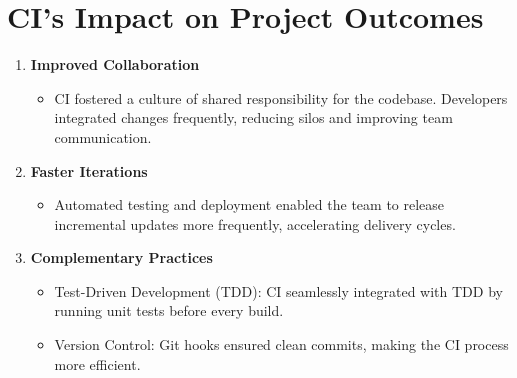 \documentclass[a4paper,12pt]{article}
\begin{document}
\section{CI’s Impact on Project Outcomes}
\begin{enumerate}
    \item \textbf{Improved Collaboration}
        \begin{itemize}
            \item CI fostered a culture of shared responsibility for the codebase. Developers integrated changes
                frequently, reducing silos and improving team communication.
        \end{itemize}
    \item \textbf{Faster Iterations}
        \begin{itemize}
            \item Automated testing and deployment enabled the team to release incremental updates more
                frequently, accelerating delivery cycles.
    \end{itemize}
\item \textbf{Complementary Practices}
    \begin{itemize}
        \item Test-Driven Development (TDD): CI seamlessly integrated with TDD by running unit tests before
            every build.
        \item Version Control: Git hooks ensured clean commits, making the CI process more efficient.
\end{itemize}
\end{enumerate}
\end{document}
